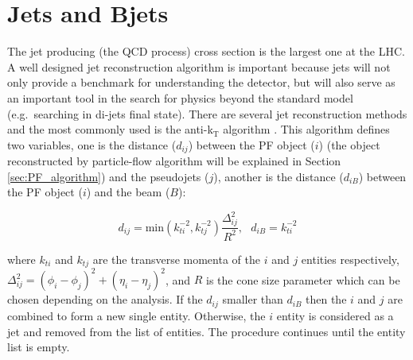 \section{Jets and Bjets}\label{sec:Jets}

The jet producing (the QCD process) cross section is the largest one at the LHC. A well designed jet reconstruction algorithm is important because jets will not only provide a benchmark for understanding the detector, but will also serve as an important tool in the search for physics beyond the standard model (e.g.~searching \ZP in di-jets final state). There are several jet reconstruction methods and the most commonly used is the anti-k$\mathrm{_T}$ algorithm \cite{jet_cds}. This algorithm defines two variables, one is the distance ($d_{ij}$) between the PF object ($i$) (the object reconstructed by particle-flow algorithm will be explained in Section \ref{sec:PF_algorithm}) and the pseudojets ($j$), another is the distance ($d_{iB}$) between the PF object ($i$) and the beam ($B$):

$$d_{ij}=\textrm{min}(k_{ti}^{-2},k_{tj}^{-2})\frac{\Delta^2_{ij}}{R^2}, ~~~d_{iB}=k_{ti}^{-2}$$

where $k_{ti}$ and $k_{tj}$ are the transverse momenta of the $i$ and $j$ entities respectively, $\Delta^2_{ij}=(\phi_i-\phi_j)^2+(\eta_i-\eta_j)^2$, and $R$ is the cone size parameter which can be chosen depending on the analysis.
If the $d_{ij}$ smaller than $d_{iB}$ then the $i$ and $j$ are combined to form a new single entity. Otherwise, the $i$ entity is considered as a jet and removed from the list of entities. The procedure continues until the entity list is empty.


